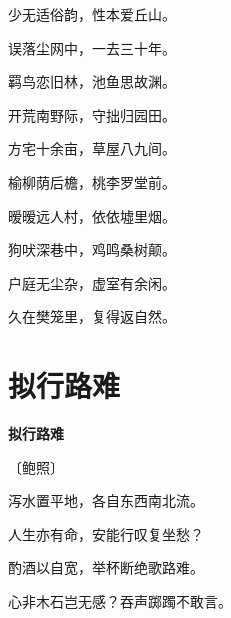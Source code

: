 \documentclass[12pt,UTF-8,openany,fontset=none]{ctexbook}
\begin{document}
\begin{center}
    \begin{Large}

        少无适俗韵，性本爱丘山。

        误落尘网中，一去三十年。

        羁鸟恋旧林，池鱼思故渊。

        开荒南野际，守拙归园田。

        方宅十余亩，草屋八九间。

        榆柳荫后檐，桃李罗堂前。

        暧暧远人村，依依墟里烟。

        狗吠深巷中，鸡鸣桑树颠。

        户庭无尘杂，虚室有余闲。

        久在樊笼里，复得返自然。

    \end{Large}

\end{center}

\vspace{8pt}
\clearpage

\section{拟行路难}


\begin{center}
    {\bfseries 拟行路难}

    \vspace{18pt}

    \begin{large}\xuwen
        〔鲍照〕
    \end{large}

\end{center}

    \vspace{18pt}  %

\begin{center}
    \begin{Large}

        泻水置平地，各自东西南北流。

        人生亦有命，安能行叹复坐愁？

        酌酒以自宽，举杯断绝歌路难。

        心非木石岂无感？吞声踯躅不敢言。\hspace{24pt}

    \end{Large}

\end{center}
\end{document}
